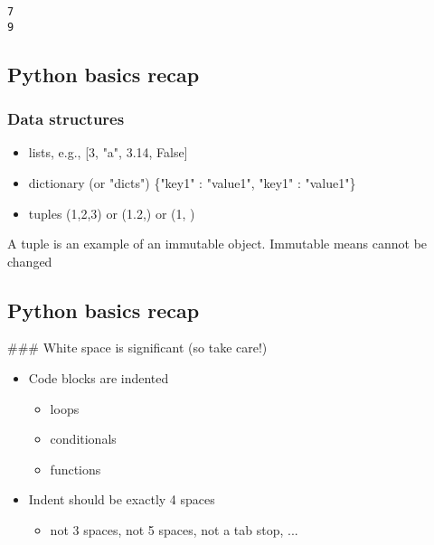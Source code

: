 \documentclass[11pt]{article}
\providecommand{\tightlist}{%
      \setlength{\itemsep}{0pt}\setlength{\parskip}{0pt}}
\begin{document}
    \begin{Verbatim}[commandchars=\\\{\}]
7
9

    \end{Verbatim}

    \subsection{Python basics recap}\label{python-basics-recap}

\subsubsection{Data structures}\label{data-structures}

\begin{itemize}
\tightlist
\item
  lists, e.g., {[}3, "a", 3.14, False{]}
\item
  dictionary (or "dicts") \{"key1" : "value1", "key1" : "value1"\}
\item
  tuples (1,2,3) or (1.2,) or (1, )
\end{itemize}

A tuple is an example of an immutable object. Immutable means cannot be
changed

    \subsection{Python basics recap}\label{python-basics-recap}

 \#\#\# White space is significant (so take care!)

\begin{itemize}
\tightlist
\item
  Code blocks are indented

  \begin{itemize}
  \tightlist
  \item
    loops
  \item
    conditionals
  \item
    functions
  \end{itemize}
\item
  Indent should be exactly 4 spaces

  \begin{itemize}
  \tightlist
  \item
    not 3 spaces, not 5 spaces, not a tab stop, ... 
  \end{itemize}
\end{itemize}
\end{document}
